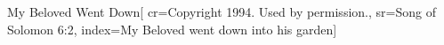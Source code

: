 {My Beloved Went Down}[
    cr={Copyright 1994.  Used by permission.},
    sr={Song of Solomon 6:2},
    index={My Beloved went down into his garden}]
